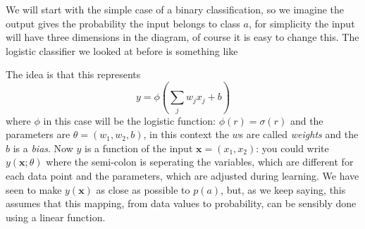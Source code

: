 \documentclass[12pt]{article}
\begin{document}
We will start with the simple case of a binary classification, so we
imagine the output gives the probability the input belongs to class
$a$, for simplicity the input will have three dimensions in the
diagram, of course it is easy to change this. The logistic classifier
we looked at before is something like
\begin{center}
\end{center}
The idea is that this represents
\begin{equation}
  y=\phi(\sum_j w_j x_j + b)
\end{equation}
where $\phi$ in this case will be the logistic function:
$\phi(r)=\sigma(r)$ and the parameters are $\theta=(w_1,w_2,b)$, in
this context the $w$s are called \textsl{weights} and the $b$ is a
\textsl{bias}. Now $y$ is a function of the input
$\mathbf{x}=(x_1,x_2)$: you could write $y(\mathbf{x};\theta)$ where
the semi-colon is seperating the variables, which are different for
each data point and the parameters, which are adjusted during
learning. We have seen to make $y(\mathbf{x})$ as close as possible to
$p(a)$, but, as we keep saying, this assumes that this mapping, from
data values to probability, can be sensibly done using a linear
function.
\end{document}
